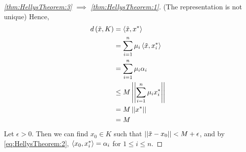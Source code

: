 \begin{thm}
\begin{proof}[\ref{thm:HellysTheorem:3} $\implies$ \ref{thm:HellysTheorem:1}]
        (The representation is not unique)
        Hence, 
        \begin{align*}
           d\left( \tilde{x}, K\right) & = \left\langle \tilde{x}, x^* \right\rangle \\ 
           & = \sum\limits_{i=1}^n \mu_i \left\langle \tilde{x}, x_i^* \right\rangle\\
           & = \sum\limits_{i=1}^n \mu_i \alpha_i \\
           & \leq M \left|\left| \sum\limits_{i=1}^n \mu_i x_i^* \right|\right| \\
           & = M \left|\left| x^* \right|\right| \\
           & = M
        \end{align*}
        Let $\epsilon > 0$. 
        Then we can find $x_0 \in K$ such that $\left|\left| \tilde{x}-x_0 \right|\right| < M+\epsilon$, and 
        by \ref{eq:HellysTheorem:2}, 
        $\left\langle x_0, x_i^* \right\rangle = \alpha_i$ for $1 \leq i \leq n$. 
    \end{proof}
\end{thm}


